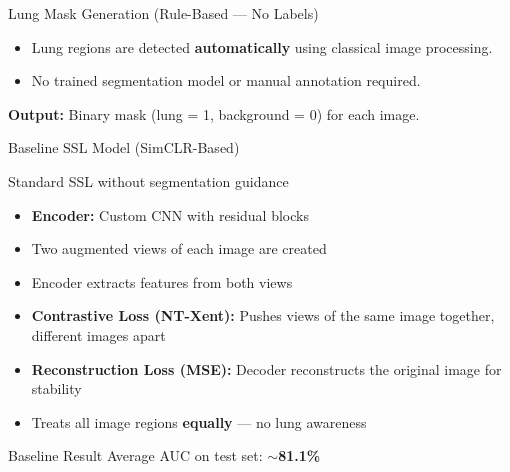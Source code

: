 \documentclass{beamer}
\begin{document}
\begin{frame}{Lung Mask Generation (Rule-Based --- No Labels)}
\begin{itemize}
    \item Lung regions are detected \textbf{automatically} using classical image processing.
    \item No trained segmentation model or manual annotation required.
\end{itemize}
\vspace{6pt}
\centering
{}
\vspace{6pt}
\begin{center}
\textbf{Output:} Binary mask (lung = 1, background = 0) for each image.
\end{center}
\end{frame}


\begin{frame}{Baseline SSL Model (SimCLR-Based)}
\begin{block}{Standard SSL without segmentation guidance}
\end{block}
\vspace{4pt}
\begin{itemize}
    \item \textbf{Encoder:} Custom CNN with residual blocks
    \item Two augmented views of each image are created
    \item Encoder extracts features from both views
    \item \textbf{Contrastive Loss (NT-Xent):} Pushes views of the same image together, different images apart
    \item \textbf{Reconstruction Loss (MSE):} Decoder reconstructs the original image for stability
    \item Treats all image regions \textbf{equally} --- no lung awareness
\end{itemize}
\vspace{6pt}
\begin{block}{Baseline Result}
Average AUC on test set: $\sim$\textbf{81.1\%}
\end{block}
\end{frame}
\end{document}
